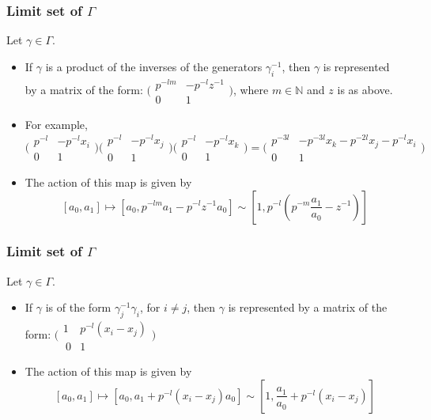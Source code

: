 \documentclass{beamer}
\theoremstyle{definition}
\begin{document}
\begin{frame}
\frametitle{Limit set of $\Gamma$}
 Let $\gamma \in \Gamma$.
\begin{itemize}
\item If $\gamma$ is a product of the inverses of the generators $\gamma_i^{-1}$, then $\gamma$ is represented by a matrix of the form:  $\bigl( \begin{smallmatrix}p^{-lm} & -p^{-l}z^{-1}\\ 0 & 1 \end{smallmatrix}\bigr)$,  where $m \in \mathbb{N}$ and $z$ is as above.
\item  For example, 
\[\bigl( \begin{smallmatrix}p^{-l} & -p^{-l}x_i\\ 0 & 1 \end{smallmatrix}\bigr) \bigl( \begin{smallmatrix}p^{-l} & -p^{-l}x_j\\ 0 & 1 \end{smallmatrix}\bigr) \bigl( \begin{smallmatrix}p^{-l} & -p^{-l}x_k\\ 0 & 1 \end{smallmatrix}\bigr) = 
\bigl( \begin{smallmatrix}p^{-3l} & -p^{-3l}x_k - p^{-2l}x_j - p ^{-l}x_i\\ 0 & 1 \end{smallmatrix}\bigr)\]
\item The action of this map is given by \[[a_0,a_1] \mapsto [a_0, p^{-lm}a_1  -p^{-l}z^{-1}a_0] \sim [1, p^{-l}(p^{-m}\frac{a_1}{a_0}- z^{-1})]\]
\end{itemize}
\end{frame}


\begin{frame}
\frametitle{Limit set of $\Gamma$}
Let $\gamma \in \Gamma$.
\begin{itemize}
\item If $\gamma$ is of the form $\gamma_j^{-1} \gamma_i$, for $i \neq j$, then $\gamma$  is represented by a matrix of the form:  $\bigl( \begin{smallmatrix}1 & p^{-l}(x_i-x_j)\\\ 0 & 1 \end{smallmatrix}\bigr)$
\item The action of this map is given by \[[a_0,a_1] \mapsto [a_0, a_1 + p^{-l}(x_i-x_j)a_0] \sim [1, \frac{a_1}{a_0} + p^{-l}(x_i-x_j)]\]
\end{itemize}
\end{frame}
\end{document}
